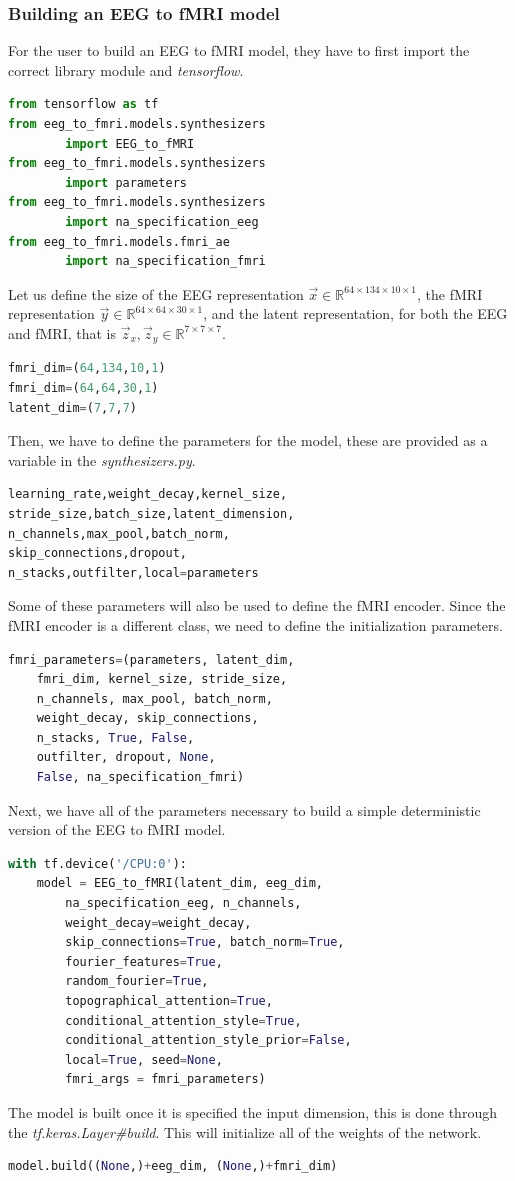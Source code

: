 \subsubsection{Building an EEG to fMRI model}\label{section:build_model}

For the user to build an EEG to fMRI model, they have to first import the correct library module and \textit{tensorflow}.
\begin{lstlisting}[language=python]
from tensorflow as tf
from eeg_to_fmri.models.synthesizers
        import EEG_to_fMRI
from eeg_to_fmri.models.synthesizers
        import parameters
from eeg_to_fmri.models.synthesizers
        import na_specification_eeg
from eeg_to_fmri.models.fmri_ae
        import na_specification_fmri
\end{lstlisting}
Let us define the size of the EEG representation $\vec{x} \in \mathbb{R}^{64\times 134\times 10 \times 1}$, the fMRI representation  $\vec{y} \in \mathbb{R}^{64\times 64\times 30\times 1}$, and the latent representation, for both the EEG and fMRI, that is $\vec{z}_x,\vec{z}_y \in \mathbb{R}^{7\times 7\times 7}$.
\begin{lstlisting}[language=python]
fmri_dim=(64,134,10,1)
fmri_dim=(64,64,30,1)
latent_dim=(7,7,7)
\end{lstlisting}
Then, we have to define the parameters for the model, these are provided as a variable in the \textit{synthesizers.py}.
\begin{lstlisting}[language=python]
learning_rate,weight_decay,kernel_size,
stride_size,batch_size,latent_dimension,
n_channels,max_pool,batch_norm,
skip_connections,dropout,
n_stacks,outfilter,local=parameters
\end{lstlisting}
Some of these parameters will also be used to define the fMRI encoder. Since the fMRI encoder is a different class, we need to define the initialization parameters.
\begin{lstlisting}[language=python]
fmri_parameters=(parameters, latent_dim,
    fmri_dim, kernel_size, stride_size,
    n_channels, max_pool, batch_norm,
    weight_decay, skip_connections,
    n_stacks, True, False,
    outfilter, dropout, None,
    False, na_specification_fmri)
\end{lstlisting}
Next, we have all of the parameters necessary to build a simple deterministic version of the EEG to fMRI model.
\begin{lstlisting}[language=python]
with tf.device('/CPU:0'):
    model = EEG_to_fMRI(latent_dim, eeg_dim,
        na_specification_eeg, n_channels,
        weight_decay=weight_decay,
        skip_connections=True, batch_norm=True,
        fourier_features=True,
        random_fourier=True,
        topographical_attention=True,
        conditional_attention_style=True,
        conditional_attention_style_prior=False,
        local=True, seed=None,
        fmri_args = fmri_parameters)
\end{lstlisting}
The model is built once it is specified the input dimension, this is done through the \textit{tf.keras.Layer\#build}. This will initialize all of the weights of the network.
\begin{lstlisting}[language=python]
model.build((None,)+eeg_dim, (None,)+fmri_dim)
\end{lstlisting}


